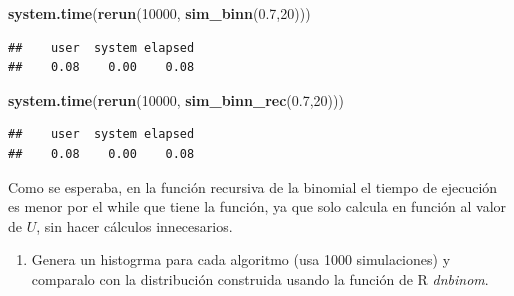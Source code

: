 \documentclass[]{article}
\newenvironment{Shaded}{\begin{snugshade}}{\end{snugshade}}
\newcommand{\DecValTok}[1]{\textcolor[rgb]{0.00,0.00,0.81}{#1}}
\newcommand{\FloatTok}[1]{\textcolor[rgb]{0.00,0.00,0.81}{#1}}
\newcommand{\KeywordTok}[1]{\textcolor[rgb]{0.13,0.29,0.53}{\textbf{#1}}}
\newcommand{\NormalTok}[1]{#1}
\providecommand{\tightlist}{%
  \setlength{\itemsep}{0pt}\setlength{\parskip}{0pt}}
\begin{document}
\begin{Shaded}
\begin{Highlighting}[]
\KeywordTok{system.time}\NormalTok{(}\KeywordTok{rerun}\NormalTok{(}\DecValTok{10000}\NormalTok{, }\KeywordTok{sim_binn}\NormalTok{(}\FloatTok{0.7}\NormalTok{,}\DecValTok{20}\NormalTok{)))}
\end{Highlighting}
\end{Shaded}

\begin{verbatim}
##    user  system elapsed 
##    0.08    0.00    0.08
\end{verbatim}

\begin{Shaded}
\begin{Highlighting}[]
\KeywordTok{system.time}\NormalTok{(}\KeywordTok{rerun}\NormalTok{(}\DecValTok{10000}\NormalTok{, }\KeywordTok{sim_binn_rec}\NormalTok{(}\FloatTok{0.7}\NormalTok{,}\DecValTok{20}\NormalTok{)))}
\end{Highlighting}
\end{Shaded}

\begin{verbatim}
##    user  system elapsed 
##    0.08    0.00    0.08
\end{verbatim}

Como se esperaba, en la función recursiva de la binomial el tiempo de
ejecución es menor por el while que tiene la función, ya que solo
calcula en función al valor de \(U\), sin hacer cálculos innecesarios.

\begin{enumerate}
\def\labelenumi{\alph{enumi})}
\setcounter{enumi}{4}
\tightlist
\item
  Genera un histogrma para cada algoritmo (usa 1000 simulaciones) y
  comparalo con la distribución construida usando la función de R
  \emph{dnbinom}.
\end{enumerate}
\end{document}
